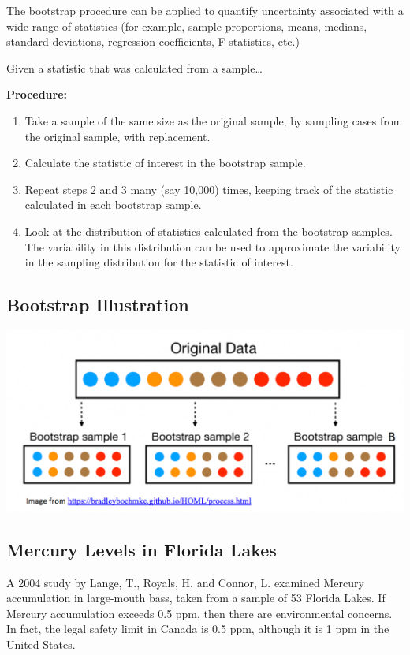 \documentclass[]{book}
\begin{document}
The bootstrap procedure can be applied to quantify uncertainty
associated with a wide range of statistics (for example, sample
proportions, means, medians, standard deviations, regression
coefficients, F-statistics, etc.)

Given a statistic that was calculated from a sample\ldots{}

\textbf{Procedure:}

\begin{enumerate}
\def\labelenumi{\arabic{enumi}.}
\item
  Take a sample of the same size as the original sample, by sampling
  cases from the original sample, with replacement.
\item
  Calculate the statistic of interest in the bootstrap sample.
\item
  Repeat steps 2 and 3 many (say 10,000) times, keeping track of the
  statistic calculated in each bootstrap sample.
\item
  Look at the distribution of statistics calculated from the bootstrap
  samples. The variability in this distribution can be used to
  approximate the variability in the sampling distribution for the
  statistic of interest.
\end{enumerate}

\subsection{Bootstrap Illustration}\label{bootstrap-illustration}

\includegraphics[width=1\linewidth]{Bootstrap}

\subsection{Mercury Levels in Florida
Lakes}\label{mercury-levels-in-florida-lakes}

A 2004 study by Lange, T., Royals, H. and Connor, L. examined Mercury
accumulation in large-mouth bass, taken from a sample of 53 Florida
Lakes. If Mercury accumulation exceeds 0.5 ppm, then there are
environmental concerns. In fact, the legal safety limit in Canada is 0.5
ppm, although it is 1 ppm in the United States.
\end{document}
